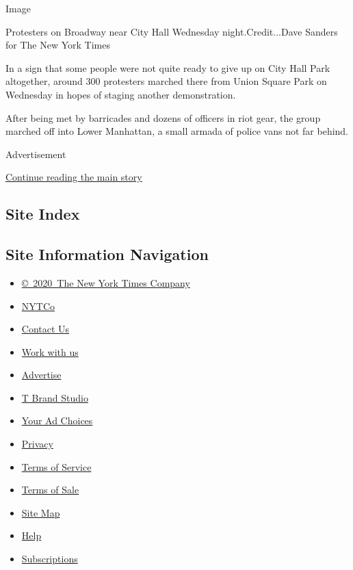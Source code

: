 Image

Protesters on Broadway near City Hall Wednesday night.Credit...Dave
Sanders for The New York Times

In a sign that some people were not quite ready to give up on City Hall
Park altogether, around 300 protesters marched there from Union Square
Park on Wednesday in hopes of staging another demonstration.

After being met by barricades and dozens of officers in riot gear, the
group marched off into Lower Manhattan, a small armada of police vans
not far behind.

Advertisement

\protect\hyperlink{after-bottom}{Continue reading the main story}

\hypertarget{site-index}{%
\subsection{Site Index}\label{site-index}}

\hypertarget{site-information-navigation}{%
\subsection{Site Information
Navigation}\label{site-information-navigation}}

\begin{itemize}
\tightlist
\item
  \href{https://help.nytimes3xbfgragh.onion/hc/en-us/articles/115014792127-Copyright-notice}{©~2020~The
  New York Times Company}
\end{itemize}

\begin{itemize}
\tightlist
\item
  \href{https://www.nytco.com/}{NYTCo}
\item
  \href{https://help.nytimes3xbfgragh.onion/hc/en-us/articles/115015385887-Contact-Us}{Contact
  Us}
\item
  \href{https://www.nytco.com/careers/}{Work with us}
\item
  \href{https://nytmediakit.com/}{Advertise}
\item
  \href{http://www.tbrandstudio.com/}{T Brand Studio}
\item
  \href{https://www.nytimes3xbfgragh.onion/privacy/cookie-policy\#how-do-i-manage-trackers}{Your
  Ad Choices}
\item
  \href{https://www.nytimes3xbfgragh.onion/privacy}{Privacy}
\item
  \href{https://help.nytimes3xbfgragh.onion/hc/en-us/articles/115014893428-Terms-of-service}{Terms
  of Service}
\item
  \href{https://help.nytimes3xbfgragh.onion/hc/en-us/articles/115014893968-Terms-of-sale}{Terms
  of Sale}
\item
  \href{https://spiderbites.nytimes3xbfgragh.onion}{Site Map}
\item
  \href{https://help.nytimes3xbfgragh.onion/hc/en-us}{Help}
\item
  \href{https://www.nytimes3xbfgragh.onion/subscription?campaignId=37WXW}{Subscriptions}
\end{itemize}
